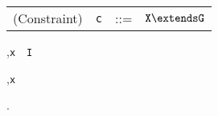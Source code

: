 \begin{figure*}
\begin{minipage}{.4\textwidth}
\centering
\begin{tabular}{r@{\quad}rcl}
  (Constraint) & {\tt c} &{::=}& $\tt X\extends G$ \\
\end{tabular}
\end{minipage}%
\begin{minipage}{.6\textwidth}
\vspace{-\bigskipamount}
\quad{}
	{\Gamma,{\tt x}~\has~{\tt I}}
\end{minipage}%

\begin{minipage}{.30\textwidth}
\quad{}
	{}
\end{minipage}%
\begin{minipage}{.36\textwidth}
\quad{}
	{\Gamma\vdash\false}
\end{minipage}%
\begin{minipage}{.34\textwidth}
\quad{}
	{\Gamma,{\tt x}}
\end{minipage}%
\caption{.}
\label{fig:FXGB}
\end{figure*}

